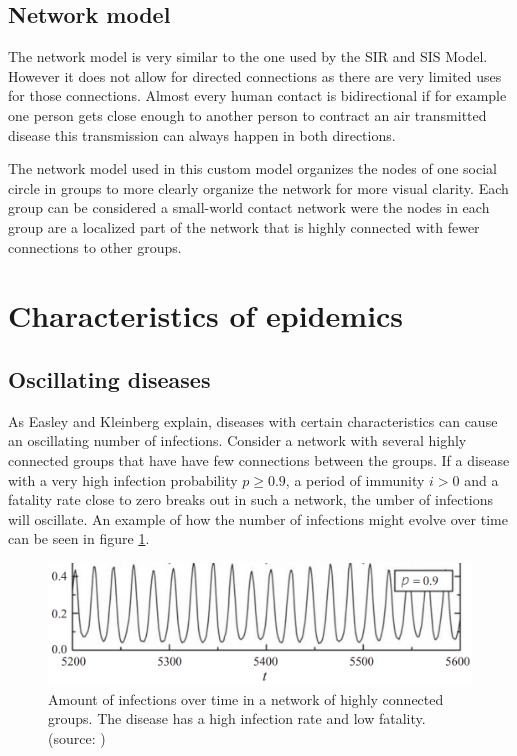 \subsection{Network model}
The network model is very similar to the one used by the SIR and SIS Model. However it does
not allow for directed connections as there are very limited uses for those connections. 
Almost every human contact is bidirectional if for example one person gets close enough to
another person to contract an air transmitted disease this transmission can always happen
in both directions.

The network model used in this custom model organizes the nodes of one social circle in groups
to more clearly organize the network for more visual clarity. Each group can be 
considered a small-world contact network were the nodes in each group are a localized part
of the network that is highly connected with fewer connections to other groups.

\section{Characteristics of epidemics}
\subsection{Oscillating diseases}
As Easley and Kleinberg \cite{networks} explain, diseases with certain characteristics
can cause an oscillating number of infections. Consider a network with several highly
connected groups that have have few connections between the groups. If a disease
with a very high infection probability $p\geq0.9$, a period of immunity $i > 0$ and a
fatality rate close to zero breaks out in such a network, the umber of infections will oscillate.
An example of how the number of infections might evolve over time can be seen in figure 
\ref{fig:oscillation}.
\begin{figure}[!ht]
    \centering
    \includegraphics[width=0.75\linewidth]{images/oscillation.png}
    \caption{Amount of infections over time in a network of highly connected 
    groups. The disease has a high infection rate and low fatality. (source: \cite{networks})}
    \label{fig:oscillation}
\end{figure}

